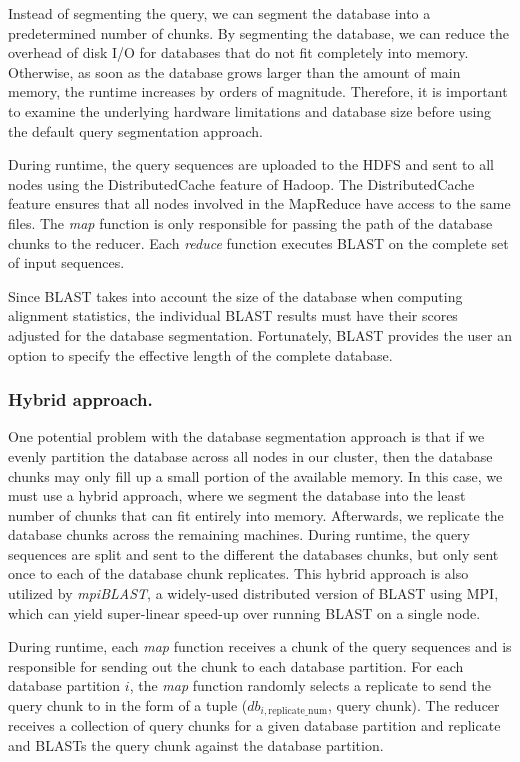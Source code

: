 \documentclass[12pt,\mydriver]{thesis}
\begin{document}
Instead of segmenting the query, we can segment the database into a predetermined number of chunks.
By segmenting the database, we can reduce the overhead of disk I/O for databases that do not fit completely into memory.
Otherwise, as soon as the database grows larger than the amount of main memory, the runtime increases by orders of magnitude\cite{darling2003design}.
Therefore, it is important to examine the underlying hardware limitations and database size before using the default query segmentation approach.

During runtime, the query sequences are uploaded to the HDFS and sent to all nodes using the DistributedCache feature of Hadoop.  The DistributedCache feature ensures that all nodes involved in the MapReduce have access to the same files.  The \emph{map} function is only responsible for passing the path of the database chunks to the reducer.  Each \emph{reduce} function executes BLAST on the complete set of input sequences.

Since BLAST takes into account the size of the database when computing alignment statistics, the individual BLAST results must have their scores adjusted for the database segmentation.
Fortunately, BLAST provides the user an option to specify the effective length of the complete database.

\subsubsection{Hybrid approach.}
One potential problem with the database segmentation approach is that if we evenly partition the database across all nodes in our cluster, then the database chunks may only fill up a small portion of the available memory.
In this case, we must use a hybrid approach, where we segment the database into the least number of chunks that can fit entirely into memory.
Afterwards, we replicate the database chunks across the remaining machines.
During runtime, the query sequences are split and sent to the different the databases chunks, but only sent once to each of the database chunk replicates.
This hybrid approach is also utilized by \emph{mpiBLAST}\cite{darling2003design}, a widely-used distributed version of BLAST using MPI, which can yield super-linear speed-up over running BLAST on a single node.

During runtime, each \emph{map} function receives a chunk of the query sequences and is responsible for sending out the chunk to each database partition.
For each database partition $i$, the \emph{map} function randomly selects a replicate to send the query chunk to in the form of a tuple ($db_{i,\text{replicate\_num}}$, query chunk).
The reducer receives a collection of query chunks for a given database partition and replicate and BLASTs the query chunk against the database partition.
\end{document}
